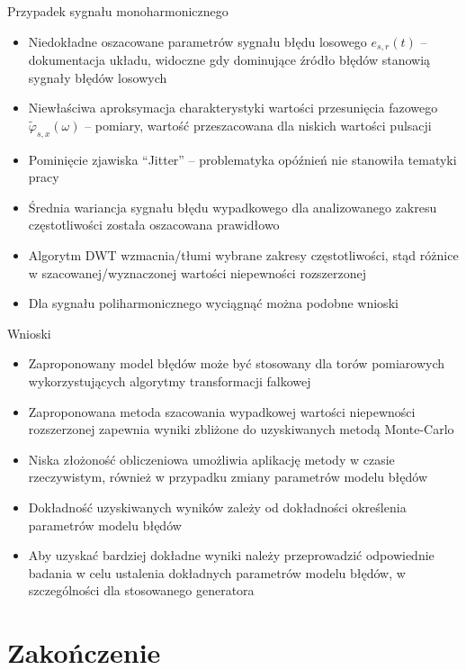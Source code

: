 \documentclass[12pt, polish, aspectratio = 169]{beamer}
\begin{document}
\begin{frame}{Przypadek sygnału monoharmonicznego}
\begin{itemize}
\item Niedokładne oszacowane parametrów sygnału błędu losowego $e_{s,r}(t)$ -- dokumentacja układu, widoczne gdy dominujące źródło błędów stanowią sygnały błędów losowych
\item Niewłaściwa aproksymacja charakterystyki wartości przesunięcia fazowego $\tilde{\varphi}_{s,x}(\omega)$ -- pomiary, wartość przeszacowana dla niskich wartości pulsacji
\item Pominięcie zjawiska \enquote{Jitter} -- problematyka opóźnień nie stanowiła tematyki pracy
\end{itemize}
\begin{itemize}
\item Średnia wariancja sygnału błędu wypadkowego dla analizowanego zakresu częstotliwości została oszacowana prawidłowo
\item Algorytm DWT wzmacnia/tłumi wybrane zakresy częstotliwości, stąd różnice w szacowanej/wyznaczonej wartości niepewności rozszerzonej
\item Dla sygnału poliharmonicznego wyciągnąć można podobne wnioski
\end{itemize}
\end{frame}


\begin{frame}{Wnioski}
\begin{itemize}
\item Zaproponowany model błędów może być stosowany dla torów pomiarowych wykorzystujących algorytmy transformacji falkowej
\item Zaproponowana metoda szacowania wypadkowej wartości niepewności rozszerzonej zapewnia wyniki zbliżone do uzyskiwanych metodą Monte-Carlo
\item Niska złożoność obliczeniowa umożliwia aplikację metody w czasie rzeczywistym, również w przypadku zmiany parametrów modelu błędów
\item Dokładność uzyskiwanych wyników zależy od dokładności określenia parametrów modelu błędów
\item Aby uzyskać bardziej dokładne wyniki należy przeprowadzić odpowiednie badania w celu ustalenia dokładnych parametrów modelu błędów, w szczególności dla stosowanego generatora
\end{itemize}
\end{frame}

\section*{Zakończenie}

\begin{frame}[plain]
\lastpage
\end{frame}
\end{document}
